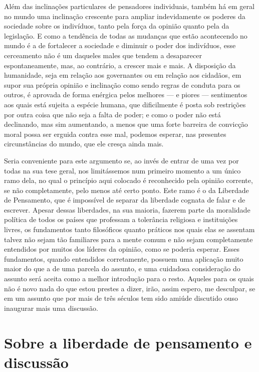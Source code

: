 Além das inclinações particulares de pensadores individuais, também há em geral
no mundo uma inclinação crescente para ampliar indevidamente
os poderes da sociedade sobre os indivíduos, tanto pela força da
opinião quanto pela da legislação. E como a tendência de todas as
mudanças que estão acontecendo no mundo é a de fortalecer a sociedade e		\EP[-1]
diminuir o poder dos indivíduos, esse cerceamento não é um daqueles
males que tendem a desaparecer espontaneamente, mas, ao contrário, a
crescer mais e mais. A disposição da humanidade, seja em relação aos
governantes ou em relação aos cidadãos, em supor sua própria opinião
e inclinação como sendo regras de conduta para os outros, é aprovada de
forma enérgica pelos melhores --- e piores --- sentimentos aos quais está
sujeita a espécie humana, que dificilmente é posta sob restrições por
outra coisa que não seja a falta de poder; e como o poder não está
declinando, mas sim aumentando, a menos que uma forte barreira de
convicção moral possa ser erguida contra esse mal, podemos esperar, nas
presentes circunstâncias do mundo, que ele cresça ainda mais. 

Seria conveniente para este argumento se, ao invés de entrar de uma vez
por todas na sua tese geral, nos limitássemos num primeiro momento a um
único ramo dela, no qual o princípio aqui colocado é reconhecido pela opinião
corrente, se não completamente, pelo menos até certo ponto. 
Este ramo é o da Liberdade de Pensamento, que é impossível 
de separar da liberdade cognata de falar e de escrever. Apesar dessas
liberdades, na sua maioria, fazerem parte da moralidade política de	\EP[-1]
todos os países que professam a tolerância religiosa e instituições
livres, os fundamentos tanto filosóficos quanto práticos nos quais
elas se assentam talvez não sejam tão familiares para a mente comum e
não sejam completamente entendidos por muitos dos líderes da opinião,
como se poderia esperar. Esses fundamentos, quando entendidos
corretamente, possuem uma aplicação muito maior do que a de uma parcela
do assunto, e uma cuidadosa consideração do assunto será aceita como
a melhor introdução para o resto. Aqueles para os quais não 
é novo nada do que estou prestes a dizer, irão, assim espero, me desculpar, se em um
assunto que por mais de três séculos tem sido amiúde discutido ouso
inaugurar mais uma discussão. 

\oneside
\chapter[Sobre a liberdade]{Sobre a liberdade de pensamento e discussão}

